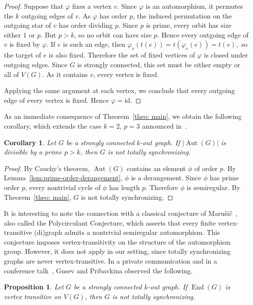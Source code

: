\documentclass[a4paper,10pt]{amsart}
\theoremstyle{plain}
\newtheorem{proposition}[theorem]{Proposition}
\newtheorem{corollary}[theorem]{Corollary}
\theoremstyle{definition}
\DeclareMathOperator{\Aut}{Aut}
\DeclareMathOperator{\End}{End}
\newcommand{\id}{\mathrm{id}}
\begin{document}
\begin{proof}
Suppose that $\varphi$ fixes a vertex $v$. Since $\varphi$ is an automorphism, it permutes the $k$ outgoing edges of $v$. As $\varphi$ has order $p$, the induced permutation on the outgoing star of $v$ has order dividing $p$. Since $p$ is prime, every orbit has size either $1$ or $p$. But $p>k$, so no orbit can have size $p$. Hence every outgoing edge of $v$ is fixed by $\varphi$. If $e$ is such an edge, then \(\varphi_v(t(e))=t(\varphi_e(e))=t(e),\) so the target of $e$ is also fixed. Therefore the set of fixed vertices of $\varphi$ is closed under outgoing edges. Since $G$ is strongly connected, this set must be either empty or all of $V(G)$. As it contains $v$, every vertex is fixed.

Applying the same argument at each vertex, we conclude that every outgoing edge of every vertex is fixed. Hence $\varphi=\id$.
\end{proof}

As an immediate consequence of Theorem~\ref{theo: main}, we obtain the following corollary, which extends the case $k=2$, $p=3$ announced in~\cite{PribavkinaSandGAL2019}.

\begin{corollary}\label{cor:prime-divisor-greater-than-k}
Let $G$ be a strongly connected $k$-out graph. If $|\Aut(G)|$ is divisible by a prime $p>k$, then $G$ is not totally synchronizing.
\end{corollary}

\begin{proof}
By Cauchy's theorem, $\Aut(G)$ contains an element $\phi$ of order $p$. By Lemma~\ref{lem:prime-order-derangement}, $\phi$ is a derangement. Since $\phi$ has prime order $p$, every nontrivial cycle of $\phi$ has length $p$. Therefore $\phi$ is semiregular. By Theorem~\ref{theo: main}, $G$ is not totally synchronizing.
\end{proof}

It is interesting to note the connection with a classical conjecture of Marušič~\cite{Marusic1981}, also called the Polycirculant Conjecture, which asserts that every finite vertex-transitive (di)graph admits a nontrivial semiregular automorphism. This conjecture imposes vertex-transitivity on the structure of the automorphism group. However, it does not apply in our setting, since totally synchronizing graphs are never vertex-transitive. In a private communication and in a conference talk~\cite{PribavkinaSandGAL2019}, Gusev and Pribavkina observed the following.
\begin{proposition}
Let $G$ be a strongly connected $k$-out graph. If $\End(G)$ is vertex transitive on $V(G)$, then $G$ is not totally synchronizing.
\end{proposition}
\end{document}
